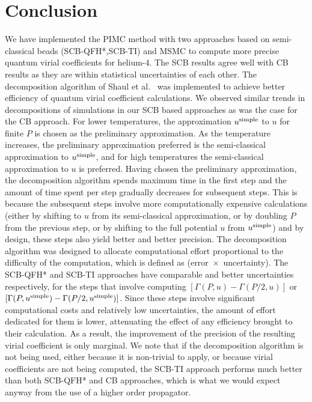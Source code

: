     \section{Conclusion}
    \label{sec:heConclusion}
        We have implemented the PIMC method with two approaches based on semi-classical beads (SCB-QFH*,SCB-TI) and MSMC to compute more precise quantum virial coefficients for helium-4. The SCB results agree well with CB results as they are within statistical uncertainties of each other. The decomposition algorithm of Shaul et al.~\cite{Shaul2012} was implemented to achieve better efficiency of quantum virial coefficient calculations. We observed similar trends in decompositions of simulations in our SCB based approaches as was the case for the CB approach. For lower temperatures, the approximation $u^{\rm simple}$ to $u$ for finite $P$ is chosen as the preliminary approximation. As the temperature increases, the preliminary approximation preferred is the semi-classical approximation to $u^{\rm simple}$, and for high temperatures the semi-classical approximation to $u$ is preferred. Having chosen the preliminary approximation, the decomposition algorithm spends maximum time in the first step and the amount of time spent per step gradually decreases for subsequent steps. This is because the subsequent steps involve more computationally expensive calculations (either by shifting to $u$ from its semi-classical approximation, or by doubling $P$ from the previous step, or by shifting to the full potential $u$ from $u^{\rm simple}$) and by design, these steps also yield better and better precision. The decomposition algorithm was designed to allocate computational effort proportional to the difficulty of the computation, which is defined as (error~$\times$~uncertainty). The SCB-QFH* and SCB-TI approaches have comparable and better uncertainties respectively, for the steps that involve computing $[\Gamma(P,u) - \Gamma(P/2,u)]$ or $[\Gamma(P,u^{\rm simple}) - \Gamma(P/2,u^{\rm simple})]$. Since these steps involve significant computational costs and relatively low uncertainties, the amount of effort dedicated for them is lower, attenuating the effect of any efficiency brought to their calculation. As a result, the improvement of the precision of the resulting virial coefficient is only marginal. We note that if the decomposition algorithm is not being used, either because it is non-trivial to apply, or because virial coefficients are not being computed, the SCB-TI approach performs much better than both SCB-QFH* and CB approaches, which is what we would expect anyway from the use of a higher order propagator.

